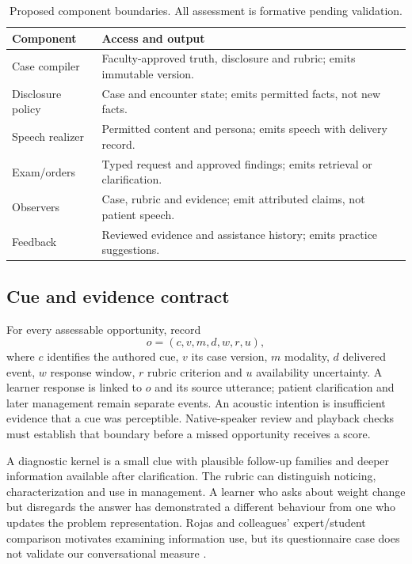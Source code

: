 \documentclass[pmlr,twocolumn,10pt]{jmlr}
\begin{document}
\begin{table}[t]
\caption{Proposed component boundaries. All assessment is formative pending validation.}
\label{tab:components}
\small
\begin{tabular}{@{}p{.24\linewidth}p{.68\linewidth}@{}}
\toprule
Component & Access and output \\
\midrule
Case compiler & Faculty-approved truth, disclosure and rubric; emits immutable version. \\
Disclosure policy & Case and encounter state; emits permitted facts, not new facts. \\
Speech realizer & Permitted content and persona; emits speech with delivery record. \\
Exam/orders & Typed request and approved findings; emits retrieval or clarification. \\
Observers & Case, rubric and evidence; emit attributed claims, not patient speech. \\
Feedback & Reviewed evidence and assistance history; emits practice suggestions. \\
\bottomrule
\end{tabular}
\end{table}

\subsection{Cue and evidence contract}
For every assessable opportunity, record
\[
o=(c,v,m,d,w,r,u),
\]
where $c$ identifies the authored cue, $v$ its case version, $m$ modality, $d$ delivered event, $w$ response window, $r$ rubric criterion and $u$ availability uncertainty. A learner response is linked to $o$ and its source utterance; patient clarification and later management remain separate events. An acoustic intention is insufficient evidence that a cue was perceptible. Native-speaker review and playback checks must establish that boundary before a missed opportunity receives a score.

A diagnostic kernel is a small clue with plausible follow-up families and deeper information available after clarification. The rubric can distinguish noticing, characterization and use in management. A learner who asks about weight change but disregards the answer has demonstrated a different behaviour from one who updates the problem representation. Rojas and colleagues' expert/student comparison motivates examining information use, but its questionnaire case does not validate our conversational measure \citep{rojas2024}.
\end{document}
